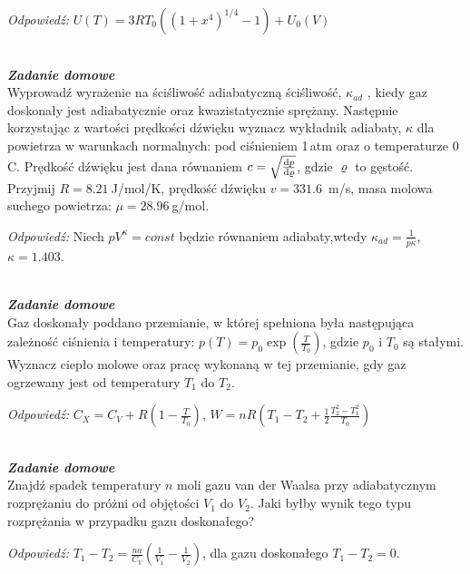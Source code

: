 \documentclass[11pt,a4paper]{article}
\newcounter{zaddom}\newcommand{\zaddom}[1][]{\addtocounter{zaddom}{1} ~\\  {\bf \emph{Zadanie domowe \arabic{zaddom} #1 }} \\}
\begin{document}
{\it Odpowiedź:} $U(T) = 3R T_0 \left(\left(1+x^4\right)^{1/4}-1\right) + U_{0}(V)$

\zaddom
Wyprowadź wyrażenie na ściśliwość adiabatyczną ściśliwość, $\kappa_{ad}$ ,
kiedy gaz doskonały jest adiabatycznie oraz kwazistatycznie sprężany.
Następnie korzystając z wartości prędkości dźwięku wyznacz wykładnik adiabaty, 
$\kappa$ dla powietrza w warunkach normalnych:
pod ciśnieniem 1\,atm oraz o temperaturze 0\degree\,C.
Prędkość dźwięku jest dana równaniem $c=\sqrt{\dv{p}{\varrho}}$, gdzie $\varrho$ to gęstość.
Przyjmij $R = 8.21~$J/mol/K, prędkość dźwięku $v= 331.6$~m/s,
masa molowa suchego powietrza: $\mu = 28.96~$g/mol.

{\it Odpowiedź:} Niech $pV^\kappa=const$ będzie równaniem adiabaty,wtedy
$\kappa_{ad} = \frac{1}{p \kappa}$, $\kappa = 1.403$.

\zaddom
Gaz doskonały poddano przemianie,
w której spełniona była następująca zależność ciśnienia i temperatury:
\mbox{$p(T)=p_0 \exp(\frac{T}{T_0})$}, gdzie $p_0$ i $T_0$ są stałymi.
Wyznacz ciepło molowe oraz pracę wykonaną w tej przemianie, gdy gaz ogrzewany jest
od temperatury $T_1$ do $T_2$.

{\it Odpowiedź:}  $C_X = C_V + R\left(1 - \frac{T}{T_0}\right)$, $W = nR(T_1 - T_2 + \frac{1}{2}\frac{T_{2}^{2} - T_{1}^{2}}{T_{0}})$


\zaddom
Znajdź spadek temperatury $n$ moli gazu van der Waalsa przy adiabatycznym rozprężaniu do próżni od objętości $V_1$ do $V_2$.
Jaki byłby wynik tego typu rozprężania w przypadku gazu doskonałego?

{\it Odpowiedź:}
$T_1-T_2 = \frac{n a}{C_V} \left(\frac{1}{V_1}-\frac{1}{V_2}\right)$, 
dla gazu doskonałego $T_1-T_2 = 0$.
\end{document}
